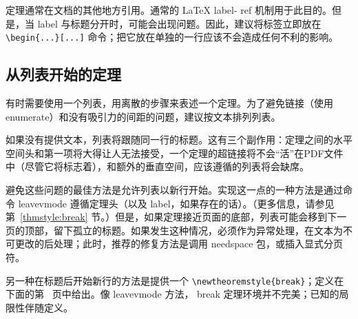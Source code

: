 \documentclass[11pt,twoside]{article}
\newcommand{\ntt}{%
  \fontfamily\ttdefault \fontseries\mddefault \fontshape\updefault
  \selectfont
}
\DeclareRobustCommand{\cn}[1]{{\ntt\bslchar#1}}
\DeclareRobustCommand{\pkg}[1]{{\ntt#1}}
\DeclareRobustCommand{\env}[1]{{\ntt#1}}
\def\latex/{{\protect\LaTeX}}
\begin{document}
定理通常在文档的其他地方引用。通常的 \latex/ \cn{label}-\cn{ref} 机制用于此目的。但是，当 \cn{label} 与标题分开时，可能会出现问题。因此，建议将标签立即放在 \verb+\begin{...}[...]+ 命令；把它放在单独的一行应该不会造成任何不利的影响。

\subsection{从列表开始的定理}
\label{ThmWithList}

有时需要使用一个列表，用离散的步骤来表述一个定理。为了避免链接（使用 \env{enumerate}）和没有吸引力的间距的问题，建议按文本排列列表。

如果没有提供文本，列表将跟随同一行的标题。这有三个副作用：定理之间的水平空间头和第一项将大得让人无法接受，一个定理的超链接将不会“活”在PDF文件中（尽管它将标志着），和额外的垂直空间，应该遵循的列表将会缺席。

避免这些问题的最佳方法是允许列表以新行开始。实现这一点的一种方法是通过命令 \cn{leavevmode} 遵循定理头（以及 \cn{label}，如果存在的话）。（更多信息，请参见第~\ref{thmstyle:break} 节。）但是，如果定理接近页面的底部，列表可能会移到下一页的顶部，留下孤立的标题。如果发生这种情况，必须作为异常处理，在文本为不可更改的后处理；此时，推荐的修复方法是调用 \pkg{needspace} \cite{NDS} 包，或插入显式分页符。

另一种在标题后开始新行的方法是提供一个 \verb+\newtheoremstyle{break}+；定义在下面的第~\pageref{thmstyle:break} 页中给出。像 \cn{leavevmode} 方法，\env{break} 定理环境并不完美；已知的局限性伴随定义。



\end{document}
